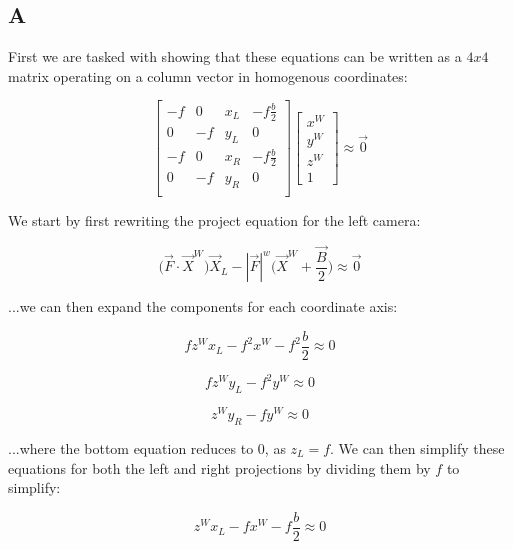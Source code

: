 \documentclass{article}
\begin{document}
\subsection*{A}

First we are tasked with showing that these equations can be written as a $4x4$ matrix operating on a column vector in homogenous coordinates:

\begin{equation}
    \begin{bmatrix}
        -f & 0 & x_L & -f \frac{b}{2}\\
        0 & -f & y_L & 0 \\
        -f & 0 & x_R & -f \frac{b}{2}\\
        0 & -f & y_R & 0 \\
    \end{bmatrix}\begin{bmatrix}
        x^W \\ y^W \\ z^W \\ 1
    \end{bmatrix}
    \approx \vec{0}
\end{equation}

\noindent We start by first rewriting the project equation for the left camera:

\begin{equation}
    \bigl( \vec{F}\cdot\vec{X}^W \bigr) \vec{X}_L - |\vec{F}|^w \bigl( \vec{X}^W + \frac{\vec{B}}{2} \bigr) \approx \vec{0}
\end{equation}

\noindent ...we can then expand the components for each coordinate axis:

\begin{equation}
    f z^W x_L - f^2 x^W - f^2 \frac{b}{2} \approx 0
\end{equation}

\begin{equation}
    f z^W y_L - f^2 y^W \approx 0
\end{equation}

\begin{equation}
    z^W y_R - f y^W \approx 0
\end{equation}

\noindent ...where the bottom equation reduces to $0$, as $z_L = f$. We can then simplify these equations for both the left and right projections by dividing them by $f$ to simplify:

\begin{equation}
    z^W x_L - f x^W - f \frac{b}{2} \approx 0
\end{equation}
\end{document}
